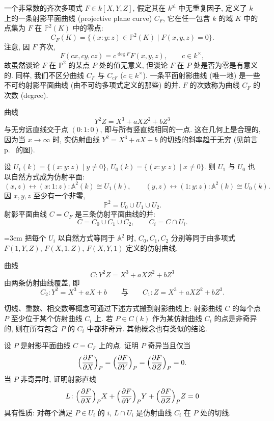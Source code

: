 一个非常数的齐次多项式 $F\in k[X,Y,Z]$, 假定其在 $k^{\mathrm{al}}$ 中无重复因子, 定义了 $k$ 上的一条射影平面曲线 (projective plane curve) $C_F$, 它在任一包含 $k$ 的域 $K$ 中的点集为 $F$ 在 $\mathbb{P}^2(K)$ 中的零点:
\[
C_F(K) = \{(x:y:z)\in\mathbb{P}^2(K) \mid F(x,y,z) = 0\}.
\]
注意, 因 $F$ 齐次,
\[
F(cx,cy,cz) = c^{\deg F}F(x,y,z), \qquad c\in k^{\times},
\]
故虽然谈论 $F$ 在 $\mathbb{P}^2$ 的某点 $P$ 处的值无意义, 但谈论 $F$ 在 $P$ 处是否为零是有意义的. 同样, 我们不区分曲线 $C_F$ 与 $C_{cF}$ ($c\in k^{\times}$). 一条平面射影曲线 (唯一地) 是一些不可约射影平面曲线 (由不可约多项式定义的那些) 的并. $F$ 的次数称为曲线 $C_F$ 的次数 (degree).

\begin{example} \label{thm:1.1.15} 
曲线
\[
Y^2Z = X^3 + aXZ^2 + bZ^3
\]
与无穷远直线交于点 $(0:1:0)$, 即与所有竖直线相同的一点. 这在几何上是合理的, 因为当 $x\to\infty$ 时, 实仿射曲线 $Y^2 = X^3 + aX + b$ 的切线的斜率趋于无穷 (见前言 p.~\pageref{chapter:intro} 的图).
\end{example}

设 $U_1(k) = \{(x:y:z) \mid y\neq 0\}$, $U_0(k) = \{(x:y:z) \mid x\neq 0\}$. 则 $U_1$ 与 $U_0$ 也以自然方式成为仿射平面:
\[
(x,z)\longleftrightarrow(x:1:z)\colon\mathbb{A}^2(k)\cong U_1(k), \qquad
(y,z)\longleftrightarrow(1:y:z)\colon\mathbb{A}^2(k)\cong U_0(k).
\]
因 $x,y,z$ 至少有一个非零,
\[
\mathbb{P}^2 = U_0\cup U_1\cup U_2.
\]
射影平面曲线 $C = C_F$ 是三条仿射平面曲线的并:
\[
C = C_0\cup C_1\cup C_2, \qquad C_i = C\cap U_i.
\]
{\emergencystretch=3em 把每个 $U_i$ 以自然方式等同于 $\mathbb{A}^2$ 时, $C_0, C_1, C_2$ 分别等同于由多项式 $F(1,Y,Z)$, $F(X,1,Z)$, $F(X,Y,1)$ 定义的仿射曲线.\par}

\begin{example} \label{thm:1.1.16} 
曲线
\[
C\colon Y^2Z = X^3 + aXZ^2 + bZ^3
\]
由两条仿射曲线覆盖, 即
\[
C_2\colon Y^2 = X^3 + aX + b \qquad \text{与} \qquad C_1\colon Z = X^3 + aXZ^2 + bZ^3.
\]
\end{example}

切线、重数、相交数等概念可通过下述方式搬到射影曲线上: 射影曲线 $C$ 的每个点 $P$ 至少位于某个仿射曲线 $C_i$ 上. 若 $P\in C(k)$ 作为某仿射曲线 $C_i$ 的点是非奇异的, 则在所有包含 $P$ 的 $C_i$ 中都非奇异. 其他概念也有类似的结论.

\begin{exercise} \label{thm:1.1.17} 
设 $P$ 是射影平面曲线 $C = C_F$ 上的点. 证明 $P$ 奇异当且仅当
\[
\Bigl(\frac{\partial F}{\partial X}\Bigr)_P = \Bigl(\frac{\partial F}{\partial Y}\Bigr)_P = \Bigl(\frac{\partial F}{\partial Z}\Bigr)_P = 0.
\]
当 $P$ 非奇异时, 证明射影直线
\[
L\colon \Bigl(\frac{\partial F}{\partial X}\Bigr)_P X + \Bigl(\frac{\partial F}{\partial Y}\Bigr)_P Y + \Bigl(\frac{\partial F}{\partial Z}\Bigr)_P Z = 0
\]
具有性质: 对每个满足 $P\in U_i$ 的 $i$, $L\cap U_i$ 是仿射曲线 $C_i$ 在 $P$ 处的切线.
\end{exercise}

